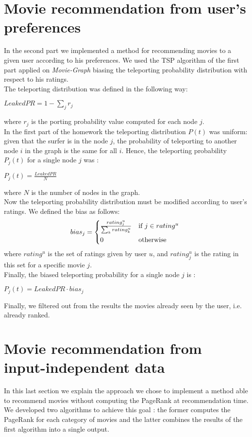 \documentclass[11pt]{article}
\begin{document}
\section{Movie recommendation from user's preferences}
In the second part we implemented a method for recommending movies to a given user according to his preferences.
We used the TSP algorithm of the first part applied on \textit{Movie\--Graph} biasing the teleporting probability
distribution with respect to his ratings.\\
The teleporting distribution was defined in the following way: \\
\begin{center}
  $LeakedPR = 1 - \sum_{j}{r_j}$
\end{center}
where $r_j$ is the porting probability value computed for each node $j$.\\
In the first part of the homework the teleporting distribution $P(t)$ was uniform:
given that the surfer is in the node $j$, the probability of teleporting to another node $i$ in the graph is the same
for all $i$. Hence, the teleporting probability $P_{j}(t)$ for a single node $j$ was :
\begin{center}
  $P_{j}(t) = \frac{LeakedPR}{N}$
\end{center}
where $N$ is the number of nodes in the graph.\\
Now the teleporting probability distribution must be modified according to user's ratings. We defined the bias as follows:
\begin{equation}
    bias_{j} =
    \begin{cases*}
      \frac{rating^{u}_{j}}{\sum_{k}{rating^{u}_{k}}} & if $j \in rating^{u}$ \\
      0        & otherwise
    \end{cases*}
  \end{equation}
where $rating^{u}$ is the set of ratings given by user $u$, and $rating^{u}_{j}$ is the rating in this set for a specific
movie $j$. \\
Finally, the biased teleporting probability for a single node $j$ is :
\begin{center}
  $P_{j}(t) = LeakedPR \cdot bias_{j}$
\end{center}
Finally, we filtered out from the results the movies already seen by the user, i.e. already ranked.

\section{\fontsize{13}{14}\selectfont Movie recommendation from input\--independent data}
In this last section we explain the approach we chose to implement a method able to recommend movies without computing
the PageRank at recommendation time. We developed two algorithms to achieve this goal : the former computes the PageRank
for each category of movies and the latter combines the results of the first algorithm into a single output. \\
\end{document}

